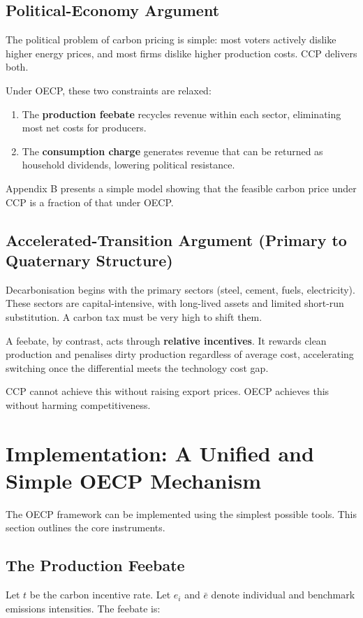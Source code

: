 \documentclass[12pt]{article}
\begin{document}
\subsection{Political-Economy Argument}
The political problem of carbon pricing is simple: most voters actively dislike higher energy prices, and most firms dislike higher production costs. CCP delivers both.

Under OECP, these two constraints are relaxed:

\begin{enumerate}
    \item The \textbf{production feebate} recycles revenue within each sector, eliminating most net costs for producers.
    \item The \textbf{consumption charge} generates revenue that can be returned as household dividends, lowering political resistance.
\end{enumerate}

Appendix B presents a simple model showing that the feasible carbon price under CCP is a fraction of that under OECP.

\subsection{Accelerated-Transition Argument (Primary to Quaternary Structure)}
Decarbonisation begins with the primary sectors (steel, cement, fuels, electricity). These sectors are capital-intensive, with long-lived assets and limited short-run substitution. A carbon tax must be very high to shift them.

A feebate, by contrast, acts through \textbf{relative incentives}. It rewards clean production and penalises dirty production regardless of average cost, accelerating switching once the differential meets the technology cost gap.

CCP cannot achieve this without raising export prices. OECP achieves this without harming competitiveness.

\section{Implementation: A Unified and Simple OECP Mechanism}
The OECP framework can be implemented using the simplest possible tools. This section outlines the core instruments.

\subsection{The Production Feebate}
Let $t$ be the carbon incentive rate. Let $e_i$ and $\bar e$ denote individual and benchmark emissions intensities. The feebate is:
\end{document}
